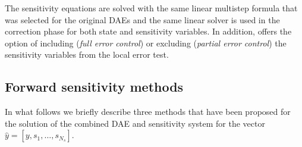 The sensitivity equations are solved with the same linear multistep formula that
was selected for the original DAEs and the same linear solver is used in the correction
phase for both state and sensitivity variables. In addition, {\idas} offers the option of
including ({\em full error control}) or excluding ({\em partial error control}) the
sensitivity variables from the local error test.

\subsection{Forward sensitivity methods}
In what follows we briefly describe three methods that have been proposed for the 
solution of the combined DAE and sensitivity system for the vector
${\hat y} = [y, s_1, \ldots , s_{N_s}]$.


